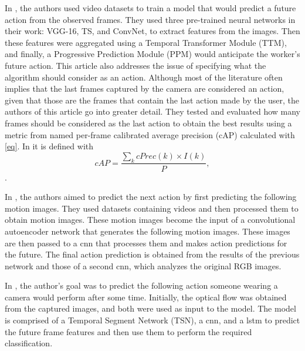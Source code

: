 In \textcite{Wang2021}, the authors used video datasets to train a model that would predict a future action from the observed frames. They used three pre-trained neural networks in their work: VGG-16, TS, and ConvNet, to extract features from the images. Then these features were aggregated using a Temporal Transformer Module (TTM), and finally, a Progressive Prediction Module (PPM) would anticipate the worker's future action. This article also addresses the issue of specifying what the algorithm should consider as an action. Although most of the literature often implies that the last frames captured by the camera are considered an action, given that those are the frames that contain the last action made by the user, the authors of this article go into greater detail. They tested and evaluated how many frames should be considered as the last action to obtain the best results using a metric from \textcite{Geest2016} named per-frame calibrated average precision (cAP) calculated with \eqref{eq}. In \cite{Wang2021} it is defined with
\begin{equation}
cAP=\frac{\sum_k cPrec(k) \times I(k)}{P},
\label{eq}
\end{equation}
.

In \textcite{Rodriguez2019}, the authors aimed to predict the next action by first predicting the following motion images. They used datasets containing videos and then processed them to obtain motion images. These motion images become the input of a convolutional autoencoder network that generates the following motion images. These images are then passed to a \acs{cnn} that processes them and makes action predictions for the future. The final action prediction is obtained from the results of the previous network and those of a second \acs{cnn}, which analyzes the original RGB images.

In \textcite{Wu2021}, the author's goal was to predict the following action someone wearing a camera would perform after some time. Initially, the optical flow was obtained from the captured images, and both were used as input to the model. The model is comprised of a Temporal Segment Network (TSN), a \acs{cnn}, and a \acs{lstm} to predict the future frame features and then use them to perform the required classification.

